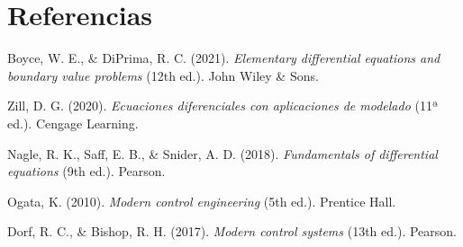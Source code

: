 \section{Referencias}

\begin{thebibliography}{}

Boyce, W. E., \& DiPrima, R. C. (2021). \textit{Elementary differential equations and boundary value problems} (12th ed.). John Wiley \& Sons.

Zill, D. G. (2020). \textit{Ecuaciones diferenciales con aplicaciones de modelado} (11ª ed.). Cengage Learning.

Nagle, R. K., Saff, E. B., \& Snider, A. D. (2018). \textit{Fundamentals of differential equations} (9th ed.). Pearson.

Ogata, K. (2010). \textit{Modern control engineering} (5th ed.). Prentice Hall.

Dorf, R. C., \& Bishop, R. H. (2017). \textit{Modern control systems} (13th ed.). Pearson.

\end{thebibliography}